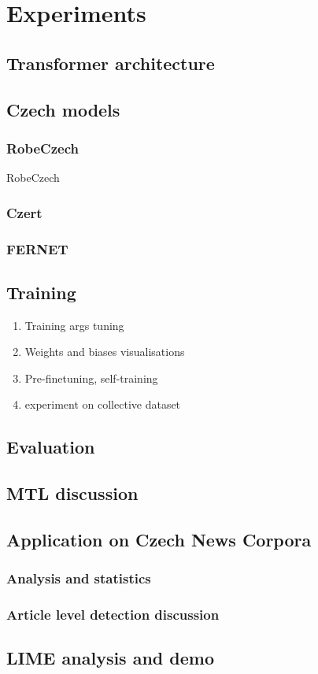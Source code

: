 \chapter{Experiments}

\section{Transformer architecture}
\section{Czech models}
\subsection{RobeCzech}
RobeCzech \cite{thorne2019fever2}
\subsection{Czert}
\subsection{FERNET}
\section{Training}
\begin{enumerate}
    \item Training args tuning
    \item Weights and biases visualisations
    \item Pre-finetuning, self-training
    \item experiment on collective dataset
\end{enumerate}

\section{Evaluation}
\section{MTL discussion}
\section{Application on Czech News Corpora}
\subsection{Analysis and statistics}
\subsection{Article level detection discussion}

\section{LIME analysis and demo}